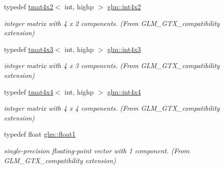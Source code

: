 \begin{DoxyCompactItemize}
\mbox{\label{group__gtx__compatibility_ga91c24f1a2df5d20ea98f97ec243782c3}} 
typedef \hyperlink{structglm_1_1tmat4x2}{tmat4x2}$<$ int, highp $>$ \hyperlink{group__gtx__compatibility_ga91c24f1a2df5d20ea98f97ec243782c3}{glm\+::int4x2}
\begin{DoxyCompactList}\small\item\em integer matrix with 4 x 2 components. (From G\+L\+M\+\_\+\+G\+T\+X\+\_\+compatibility extension) \end{DoxyCompactList}\item 
\mbox{\label{group__gtx__compatibility_ga08b035f86b94428f5913e48a4a074e97}} 
typedef \hyperlink{structglm_1_1tmat4x3}{tmat4x3}$<$ int, highp $>$ \hyperlink{group__gtx__compatibility_ga08b035f86b94428f5913e48a4a074e97}{glm\+::int4x3}
\begin{DoxyCompactList}\small\item\em integer matrix with 4 x 3 components. (From G\+L\+M\+\_\+\+G\+T\+X\+\_\+compatibility extension) \end{DoxyCompactList}\item 
\mbox{\label{group__gtx__compatibility_ga1e72ab0f7e57aae3d07ef8880c11d8b7}} 
typedef \hyperlink{structglm_1_1tmat4x4}{tmat4x4}$<$ int, highp $>$ \hyperlink{group__gtx__compatibility_ga1e72ab0f7e57aae3d07ef8880c11d8b7}{glm\+::int4x4}
\begin{DoxyCompactList}\small\item\em integer matrix with 4 x 4 components. (From G\+L\+M\+\_\+\+G\+T\+X\+\_\+compatibility extension) \end{DoxyCompactList}\item 
\mbox{\label{group__gtx__compatibility_gae0ad1b0450320cda98bbbecb56bc3167}} 
typedef float \hyperlink{group__gtx__compatibility_gae0ad1b0450320cda98bbbecb56bc3167}{glm\+::float1}
\begin{DoxyCompactList}\small\item\em single-\/precision floating-\/point vector with 1 component. (From G\+L\+M\+\_\+\+G\+T\+X\+\_\+compatibility extension) \end{DoxyCompactList}\item 
\mbox{\label{group__gtx__compatibility_ga3174e387d3b89c5dcff485c4e665a68c}} 

\end{DoxyCompactItemize}

